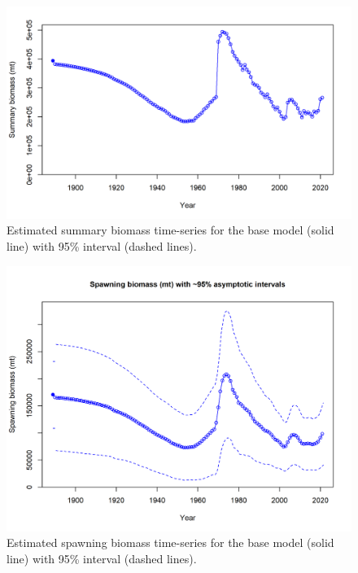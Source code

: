 \documentclass[11pt,
  english,
  a4paper,
]{article}
\begin{document}
\tagmcend\tagstructend


\begin{figure}
\centering
\includegraphics[width=1\textwidth,height=1\textheight]{figs/ts4_Summary_biomass_mt.png}
\caption{Estimated summary biomass time-series for the base model (solid line) with 95\% interval (dashed lines).\label{fig:ts1_4}}
\end{figure}

\tagmcend\tagstructend


\begin{figure}
\centering
\includegraphics[width=1\textwidth,height=1\textheight]{figs/ts7_Spawning_biomass_mt_with_95_asymptotic_intervals_intervals.png}
\caption{Estimated spawning biomass time-series for the base model (solid line) with 95\% interval (dashed lines).\label{fig:ts7}}
\end{figure}
\end{document}
